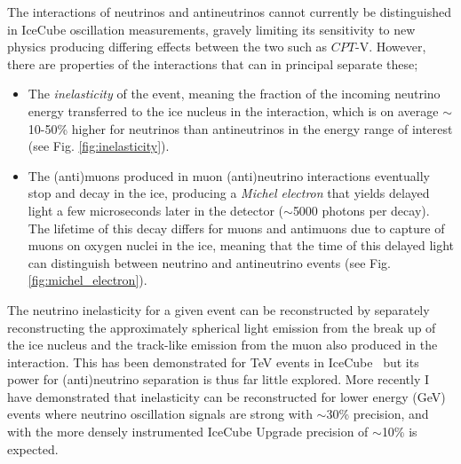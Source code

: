 \documentclass[a4paper,11pt]{article}
\begin{document}
The interactions of neutrinos and antineutrinos cannot currently be distinguished in IceCube oscillation measurements, gravely limiting its sensitivity to new physics producing differing effects between the two such as $CPT$-V. However, there are properties of the interactions that can in principal separate these;

\begin{itemize}
    \item The \textit{inelasticity} of the event, meaning the fraction of the incoming neutrino energy transferred to the ice nucleus in the interaction, which is on average $\sim$10-50\%  higher for neutrinos than antineutrinos in the energy range of interest (see Fig. \ref{fig:inelasticity}).
    \item The (anti)muons produced in muon (anti)neutrino interactions eventually stop and decay in the ice, producing a \textit{Michel electron} that yields delayed light a few microseconds later in the detector ($\sim$5000 photons per decay). The lifetime of this decay differs for muons and antimuons due to capture of muons on oxygen nuclei in the ice, meaning that the time of this delayed light can distinguish between neutrino and antineutrino events (see Fig. \ref{fig:michel_electron}). 
\end{itemize}

The neutrino inelasticity for a given event can be reconstructed by separately reconstructing the approximately spherical light emission from the break up of the ice nucleus and the track-like emission from the muon also produced in the interaction. This has been demonstrated for TeV events in IceCube~\cite{Aartsen:2018vez} but its power for (anti)neutrino separation is thus far little explored. More recently I have demonstrated that inelasticity can be reconstructed for lower energy (GeV) events where neutrino oscillation signals are strong with $\sim$30\% precision, and with the more densely instrumented IceCube Upgrade precision of $\sim$10\% is expected. 
\end{document}
